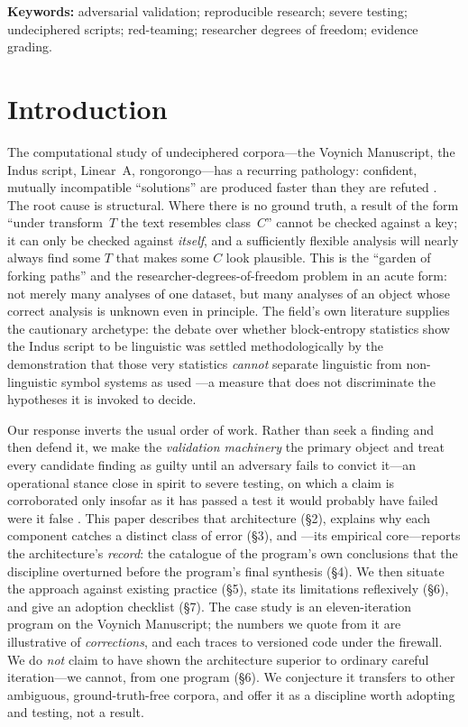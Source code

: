 \documentclass[11pt]{article}
\begin{document}
\noindent\textbf{Keywords:} adversarial validation; reproducible research; severe testing;
undeciphered scripts; red-teaming; researcher degrees of freedom; evidence grading.

\section{Introduction}
The computational study of undeciphered corpora---the Voynich Manuscript, the Indus script,
Linear~A, rongorongo---has a recurring pathology: confident, mutually incompatible
``solutions'' are produced faster than they are refuted \citep{reddy2011know,
bowern2021linguistics}. The root cause is structural. Where there is no ground truth, a
result of the form ``under transform~$T$ the text resembles class~$C$'' cannot be checked
against a key; it can only be checked against \emph{itself}, and a sufficiently flexible
analysis will nearly always find some $T$ that makes some $C$ look plausible. This is the
``garden of forking paths'' \citep{gelman2013garden} and the researcher-degrees-of-freedom
problem \citep{simmons2011false} in an acute form: not merely many analyses of one dataset,
but many analyses of an object whose correct analysis is unknown even in principle. The
field's own literature supplies the cautionary archetype: the debate over whether
block-entropy statistics show the Indus script to be linguistic \citep{rao2009entropic} was
settled methodologically by the demonstration that those very statistics \emph{cannot}
separate linguistic from non-linguistic symbol systems as used \citep{sproat2014statistical}
---a measure that does not discriminate the hypotheses it is invoked to decide.

Our response inverts the usual order of work. Rather than seek a finding and then defend it,
we make the \emph{validation machinery} the primary object and treat every candidate finding
as guilty until an adversary fails to convict it---an operational stance close in spirit to
severe testing, on which a claim is corroborated only insofar as it has passed a test it
would probably have failed were it false \citep{mayo2018severe}. This paper describes that
architecture (\S2), explains why each component catches a distinct class of error (\S3), and
---its empirical core---reports the architecture's \emph{record}: the catalogue of the
program's own conclusions that the discipline overturned before the program's final synthesis
(\S4). We then situate the approach against existing practice (\S5), state its limitations
reflexively (\S6), and give an adoption checklist (\S7). The case study is an eleven-iteration
program on the Voynich Manuscript; the numbers we quote from it are illustrative of
\emph{corrections}, and each traces to versioned code under the firewall. We do \emph{not}
claim to have shown the architecture superior to ordinary careful iteration---we cannot, from
one program (\S6). We conjecture it transfers to other ambiguous, ground-truth-free corpora,
and offer it as a discipline worth adopting and testing, not a result.
\end{document}
